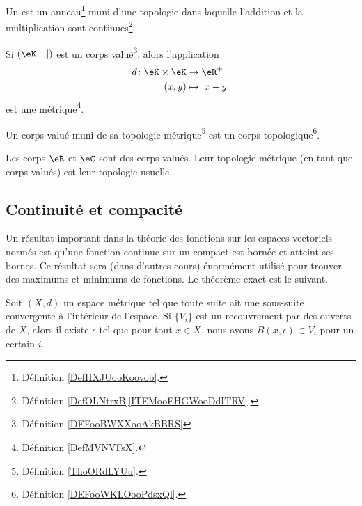 \begin{definition}      \label{DEFooWKLOooPdsxQl}
    Un  est un anneau\footnote{Définition \ref{DefHXJUooKoovob}.} muni d'une topologie dans laquelle l'addition et la multiplication sont continues\footnote{Définition \ref{DefOLNtrxB}\ref{ITEMooEHGWooDdITRV}.}.    
\end{definition}

\begin{propositionDef}      \label{PROPooAWAKooKRmbGT}
    Si \( (\eK, | . |)\) est un corps valué\footnote{Définition \ref{DEFooBWXXooAkBBRS}}, alors l'application
    \begin{equation}
        \begin{aligned}
            d\colon \eK\times \eK&\to \eR^+ \\
            (x,y)&\mapsto | x-y | 
        \end{aligned}
    \end{equation}
    est une métrique\footnote{Définition \ref{DefMVNVFsX}.}.

    Un corps valué muni de sa topologie métrique\footnote{Définition \ref{ThoORdLYUu}.} est un corps topologique\footnote{Définition \ref{DEFooWKLOooPdsxQl}.}.
\end{propositionDef}

\begin{lemma}       \label{LEMooCHDTooZsgXEK}
    Les corps \( \eR\) et \( \eC\) sont des corps valués. Leur topologie métrique (en tant que corps valués) est leur topologie usuelle.
\end{lemma}


\subsection{Continuité et compacité}

Un résultat important dans la théorie des fonctions sur les espaces vectoriels normés est qu'une fonction continue sur un compact est bornée et atteint ses bornes. Ce résultat sera (dans d'autres cours) énormément utilisé pour trouver des maximums et minimums de fonctions. Le théorème exact est le suivant.

\begin{lemma}    \label{LemQFXOWyx}
    Soit \( (X,d)\) un espace métrique tel que toute suite ait une sous-suite convergente à l'intérieur de l'espace. Si \( \{ V_i \}\) est un recouvrement par des ouverts de \( X\), alors il existe \( \epsilon\) tel que pour tout \( x\in X\), nous ayons \( B(x,\epsilon)\subset V_i\) pour un certain \( i\).
\end{lemma}

